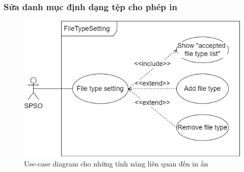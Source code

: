 \subsubsection{Sửa danh mục định dạng tệp cho phép in}
\begin{figure}[H]
    \begin{center}
        \includegraphics[width=1\textwidth]{Images/Requirement Elicitation/FileTypeSetting_Use-case.png}
        \caption{Use-case diagram cho những tính năng liên quan đến in ấn}
        \label{fig:arch}
    \end{center}
\end{figure}
